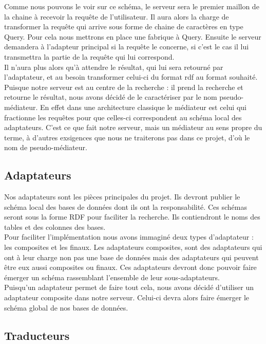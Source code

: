 \documentclass[12pt]{article}
\begin{document}
	Comme nous pouvons le voir sur ce schéma, le serveur sera le premier maillon de la chaine à recevoir la requête de l'utilisateur. Il aura alors la charge de transformer la requête qui arrive sous forme de chaine de caractères en type Query. Pour cela nous mettrons en place une fabrique à Query. Ensuite le serveur demandera à l'adapteur principal si la requête le concerne, si c'est le cas il lui transmettra la partie de la requête qui lui correspond.\\
	\indent Il n'aura plus alors qu'à attendre le résultat, qui lui sera retourné par l'adaptateur, et au besoin transformer celui-ci du format rdf au format souhaité.\\
	\indent Puisque notre serveur est au centre de la recherche : il prend la recherche et retourne le résultat, nous avons décidé de le caractériser par le nom pseudo-médiateur. En effet dans une architecture classique le médiateur est celui qui fractionne les requêtes pour que celles-ci correspondent au schéma local des adaptateurs. C'est ce que fait notre serveur, mais un médiateur au sens propre du terme, à d'autres exsigences que nous ne traiterons pas dans ce projet, d'où le nom de pseudo-médiateur.

\subsection{Adaptateurs}

	Nos adaptateurs sont les pièces principales du projet. Ils devront publier le schéma local des bases de données dont ils ont la responsabilité. Ces schémas seront sous la forme RDF pour faciliter la recherche. Ils contiendront le noms des tables et des colonnes des bases.\\
	\indent Pour faciliter l'implémentation nous avons immaginé deux types d'adaptateur : les composites et les finaux.
	\indent Les adaptateurs composites, sont des adaptateurs qui ont à leur charge non pas une base de données mais des adaptateurs qui peuvent être eux aussi composites ou finaux. Ces adaptateurs devront donc pouvoir faire émerger un schéma rassemblant l'ensemble de leur sous-adaptateurs.\\
	\indent Puisqu'un adaptateur permet de faire tout cela, nous avons décidé d'utiliser un adaptateur composite dans notre serveur. Celui-ci devra alors faire émerger le schéma global de nos bases de données.

\subsection{Traducteurs}
\end{document}
